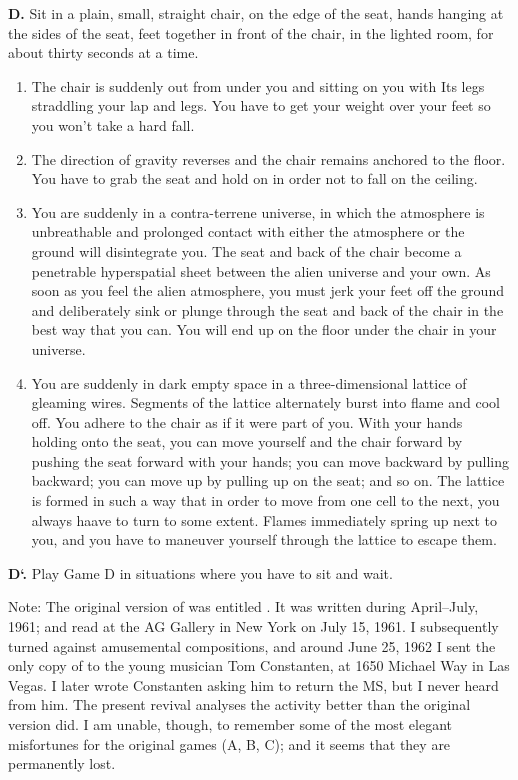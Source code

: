\textbf{D.} Sit in a plain, small, straight chair, on the edge of the seat, hands 
hanging at the sides of the seat, feet together in front of the chair, in the 
lighted room, for about thirty seconds at a time. 

\begin{enumerate}
\item The chair is suddenly out from under you and sitting on you with Its legs 
straddling your lap and legs. You have to get your weight over your feet so 
you won't take a hard fall. 

\item The direction of gravity reverses and the chair remains anchored to the 
floor. You have to grab the seat and hold on in order not to fall on the 
ceiling. 

\item You are suddenly in a contra-terrene universe, in which the atmosphere is 
unbreathable and prolonged contact with either the atmosphere or the 
ground will disintegrate you. The seat and back of the chair become a 
penetrable hyperspatial sheet between the alien universe and your own. As 
soon as you feel the alien atmosphere, you must jerk your feet off the 
ground and deliberately sink or plunge through the seat and back of the chair 
in the best way that you can. You will end up on the floor under the chair in 
your universe. 

\item You are suddenly in dark empty space in a three-dimensional lattice of 
gleaming wires. Segments of the lattice alternately burst into flame and cool 
off. You adhere to the chair as if it were part of you. With your hands 
holding onto the seat, you can move yourself and the chair forward by 
pushing the seat forward with your hands; you can move backward by
pulling backward; you can move up by pulling up on the seat; and so on.
The lattice is formed in such a way that in order to move from one cell to
the next, you always haave to turn to some extent. Flames immediately
spring up next to you, and you have to maneuver yourself through the 
lattice to escape them.
\end{enumerate}

\textbf{D`.} Play Game D in situations where you have to sit and wait.

Note: The original version of  was entitled 
. It was written during April--July, 1961; and
read at the AG Gallery in New York on July 15, 1961. I subsequently turned
against amusemental compositions, and around June 25, 1962 I sent the
only copy of  to the young musician Tom
Constanten, at 1650 Michael Way in Las Vegas. I later wrote Constanten 
asking him to return the MS, but I never heard from him. The present revival
analyses the activity better than the original version did. I am unable,
though, to remember some of the most elegant misfortunes for the original
games (A, B, C); and it seems that they are permanently lost.

